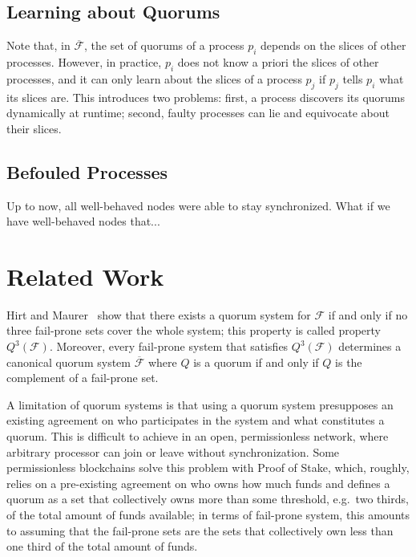 \documentclass[11pt,letterpaper]{article}
\begin{document}
\subsection{Learning about Quorums}

Note that, in $\overline{\mathcal{F}}$, the set of quorums of a process $p_i$ depends on the slices of other processes.
However, in practice, $p_i$ does not know a priori the slices of other processes, and it can only learn about the slices of a process $p_j$ if $p_j$ tells $p_i$ what its slices are.
This introduces two problems: first, a process discovers its quorums dynamically at runtime; second, faulty processes can lie and equivocate about their slices.

\subsection{Befouled Processes}

Up to now, all well-behaved nodes were able to stay synchronized.
What if we have well-behaved nodes that...

\section{Related Work}

Hirt and Maurer~\cite{hirtPlayerSimulationGeneral2000} show that there exists a quorum system for $\mathcal{F}$ if and only if no three fail-prone sets cover the whole system; this property is called property $Q^3(\mathcal{F})$. Moreover, every fail-prone system that satisfies $Q^3(\mathcal{F})$ determines a canonical quorum system $\overline{\mathcal{F}}$ where $Q$ is a quorum if and only if $Q$ is the complement of a fail-prone set. %

A limitation of quorum systems is that using a quorum system presupposes an existing agreement on who participates in the system and what constitutes a quorum.
This is difficult to achieve in an open, permissionless network, where arbitrary processor can join or leave without synchronization.
Some permissionless blockchains solve this problem with Proof of Stake, which, roughly, relies on a pre-existing agreement on who owns how much funds and defines a quorum as a set that collectively owns more than some threshold, e.g.\ two thirds, of the total amount of funds available; in terms of fail-prone system, this amounts to assuming that the fail-prone sets are the sets that collectively own less than one third of the total amount of funds.
\end{document}
